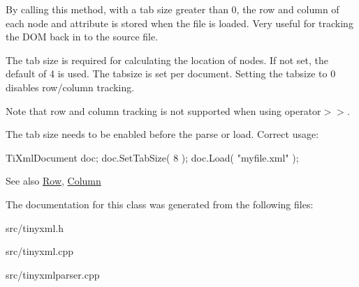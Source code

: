 \-By calling this method, with a tab size greater than 0, the row and column of each node and attribute is stored when the file is loaded. \-Very useful for tracking the \-D\-O\-M back in to the source file.

\-The tab size is required for calculating the location of nodes. \-If not set, the default of 4 is used. \-The tabsize is set per document. \-Setting the tabsize to 0 disables row/column tracking.

\-Note that row and column tracking is not supported when using operator$>$$>$.

\-The tab size needs to be enabled before the parse or load. \-Correct usage\-: \begin{DoxyVerb}
		TiXmlDocument doc;
		doc.SetTabSize( 8 );
		doc.Load( "myfile.xml" );
		\end{DoxyVerb}


\begin{DoxySeeAlso}{\-See also}
\hyperlink{classTiXmlBase_a024bceb070188df92c2a8d8852dd0853}{\-Row}, \hyperlink{classTiXmlBase_ab54bfb9b70fe6dd276e7b279cab7f003}{\-Column} 
\end{DoxySeeAlso}


\-The documentation for this class was generated from the following files\-:\begin{DoxyCompactItemize}
\item 
src/tinyxml.\-h\item 
src/tinyxml.\-cpp\item 
src/tinyxmlparser.\-cpp\end{DoxyCompactItemize}
